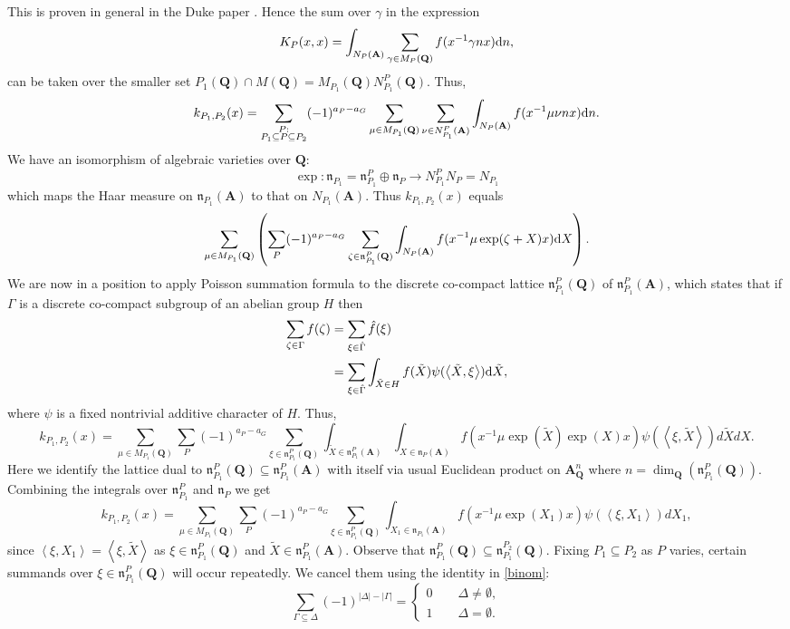 \documentclass[11pt]{amsart}
\def\apg{a_{P} - a_{G}}
\def\A{\mathbf A}
\def\Q{\mathbf Q}
\def\d{\text d}
\def\dim{\operatorname{dim}}
\def\mod#1{\lvert #1 \rvert} %
\def\nnn{\mathfrak n}
\def\se{\subseteq}
\def\sprod#1#2{\left\langle #1 , #2 \right\rangle}  %
\theoremstyle{remark}
\begin{document}
This is proven in general in the Duke paper \cite{duke}. Hence the sum over $\gamma$ in the expression
\[ K_P(x, x) = \int_{N_P(\A)} \sum_{\gamma \in M_P(\Q)} f(x^{-1} \gamma n x) \d n, \]
can be taken over the smaller set $P_1(\Q) \cap M(\Q) = M_{P_1}(\Q) N_{P_1}^P(\Q)$. 
Thus, 
\[ k_{P_1, P_2}(x) = \sum_{\substack{P : \\ P_1 \se P \se P_2}} (-1)^{\apg} \sum_{\mu \in M_{P_1}(\Q)} \sum_{\nu \in N_{P_1}^P(\A)} \int_{N_P(\A)} f(x^{-1} \mu \nu n x) \d n. \]
We have an isomorphism of algebraic varieties over $\Q$:
\[ \exp : \nnn_{P_1} = \nnn_{P_1}^P \oplus \nnn_P \to N_{P_1}^P N_P = N_{P_1} \]
which maps the Haar measure on $\nnn_{P_1}(\A)$ to that on $N_{P_1}(\A)$. Thus $k_{P_1, P_2}(x)$ equals
\[ \sum_{\mu \in M_{P_1}(\Q)} \left( \sum_P (-1)^{\apg} \sum_{\zeta \in \nnn_{P_1}^P(\Q)} \int_{N_P(\A)} 
		f(x^{-1}\mu \exp(\zeta + X)x) \d X \right). \]
We are now in a position to apply Poisson summation formula to the discrete co-compact lattice $\nnn_{P_1}^P(\Q)$ of $\nnn_{P_1}^P(\A)$, which states that if $\Gamma$ is a discrete co-compact subgroup of an abelian group $H$ then 
\begin{align*} \sum_{\zeta \in \Gamma} f(\zeta) & = \sum_{\xi \in \hat\Gamma} \hat f(\xi) \\
	& = \sum_{\xi \in \hat \Gamma} \int_{\tilde X \in H} f(\tilde X) \psi(\sprod{\tilde X}{\xi}) \d \tilde X,
\end{align*}
where $\psi$ is a fixed nontrivial additive character of $H$. Thus,
\[ k_{P_1, P_2}(x) = \sum_{\mu \in M_{P_1}(\Q)} \sum_P (-1)^{\apg} \sum_{\xi \in \nnn_{P_1}^P(\Q)}
		\int_{\tilde X \in \nnn_{P_1}^P(\A)} \int_{X \in \nnn_P(\A)} f(x^{-1}\mu \exp(\tilde X) \exp(X) x)
		\psi(\sprod{\xi}{\tilde X}) d\tilde X d X. \]
Here we identify the lattice dual to $\nnn_{P_1}^P(\Q) \se \nnn_{P_1}^P(\A)$ with itself via usual Euclidean product on $\A_{\Q}^n$ where $n = \dim_{\Q}(\nnn_{P_1}^P(\Q))$. Combining the integrals over $\nnn_{P_1}^P$ and $\nnn_P$ we get
\[ k_{P_1, P_2}(x) = \sum_{\mu \in M_{P_1}(\Q)} \sum_P (-1)^{\apg} \sum_{\xi \in \nnn_{P_1}^P(\Q)}
		\int_{X_1 \in \nnn_{P_1}(\A)} f(x^{-1}\mu \exp(X_1) x)
		\psi(\sprod{\xi}{X_1}) d X_1, \]
since $\sprod{\xi}{X_1} = \sprod{\xi}{\tilde X}$ as $\xi \in \nnn_{P_1}^P(\Q)$ and $\tilde X \in \nnn_{P_1}^P(\A)$. Observe that $\nnn_{P_1}^P(\Q) \se \nnn_{P_1}^{P_2}(\Q)$. Fixing $P_1 \se P_2$ as $P$ varies, certain summands over $\xi \in \nnn_{P_1}^P(\Q)$ will occur repeatedly. We cancel them using the identity in \cref{binom}:
\[ \sum_{\Gamma \se \Delta} (-1)^{\mod{\Delta} - \mod{\Gamma}} = 
		\begin{cases} 0 \qquad \Delta \neq \emptyset, \\ 1 \qquad \Delta = \emptyset. \end{cases} 
\]
\end{document}
